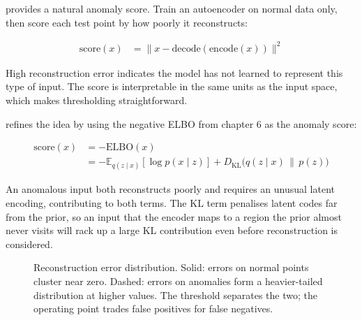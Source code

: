  provides a natural anomaly score.
Train an autoencoder on normal data only, then score each test point by how poorly it reconstructs:

\begin{align*}
    \mathrm{score}(x) &= \|x - \mathrm{decode}(\mathrm{encode}(x))\|^2
\end{align*}

High reconstruction error indicates the model has not learned to represent this type of input.
The score is interpretable in the same units as the input space, which makes thresholding straightforward.

 refines the idea by using the negative ELBO from chapter 6 as the anomaly score:

\begin{align*}
    \mathrm{score}(x) &= -\mathrm{ELBO}(x) \\
                      &= -\mathbb{E}_{q(z \mid x)}[\log p(x \mid z)] + D_{\mathrm{KL}}\!\bigl(q(z \mid x) \,\|\, p(z)\bigr)
\end{align*}

An anomalous input both reconstructs poorly and requires an unusual latent encoding, contributing to both terms.
The KL term penalises latent codes far from the prior, so an input that the encoder maps to a region the prior almost never visits will rack up a large KL contribution even before reconstruction is considered.

\begin{figure}
\centering
{}
\caption{Reconstruction error distribution. Solid: errors on normal points cluster near zero. Dashed: errors on anomalies form a heavier-tailed distribution at higher values. The threshold separates the two; the operating point trades false positives for false negatives.}
\label{fig:reconstruction_histogram}
\end{figure}


